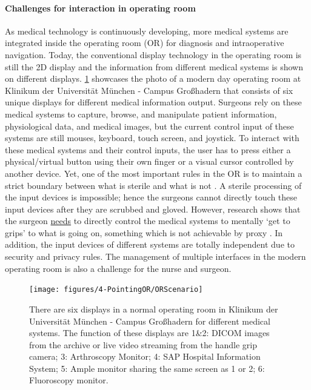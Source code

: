 \paragraph{Challenges for interaction in operating room}
As medical technology is continuously developing, more medical systems are integrated inside the operating room (OR) for diagnosis and intraoperative navigation. Today, the conventional display technology in the operating room is still the 2D display and the information from different medical systems is shown on different displays.
\figurename{\ref{fig:1-intro:ORScenario}} showcases the photo of a modern day operating room at Klinikum der Universit\"at M\"unchen - Campus Gro{\ss}hadern that consists of six unique displays for different medical information output. 
Surgeons rely on these medical systems to capture, browse, and manipulate patient information, physiological data, and medical images, but the current control input of these systems are still mouses, keyboard, touch screen, and joystick. To interact with these medical systems and their control inputs, the user has to press either a physical/virtual button using their own finger or a visual cursor controlled by another device. 
Yet, one of the most important rules in the OR is to maintain a strict boundary between what is sterile and what is not \cite{OHara2014a}. A sterile processing of the input devices is impossible; hence the surgeons cannot directly touch these input devices after they are scrubbed and gloved. However, research shows that the surgeon \underline{needs} to directly control the medical systems to mentally `get to grips' to what is going on, something which is not achievable by proxy \cite{Johnson2011a}. In addition, the input devices of different systems are totally independent due to security and privacy rules. The management of multiple interfaces in the modern operating room is also a challenge for the nurse and surgeon.
\begin{figure} [htb]
	\centering
	\texttt{[image: figures/4-PointingOR/ORScenario]}
	\caption{There are six displays in a normal operating room in Klinikum der Universit\"at M\"unchen - Campus Gro{\ss}hadern for different medical systems. The function of these displays are 1\&2: DICOM images from the archive or live video streaming from the handle grip camera; 3: Arthroscopy Monitor; 4: SAP Hospital Information System; 5: Ample monitor sharing the same screen as 1 or 2; 6: Fluoroscopy monitor.}
	\label{fig:1-intro:ORScenario}       %
\end{figure}
